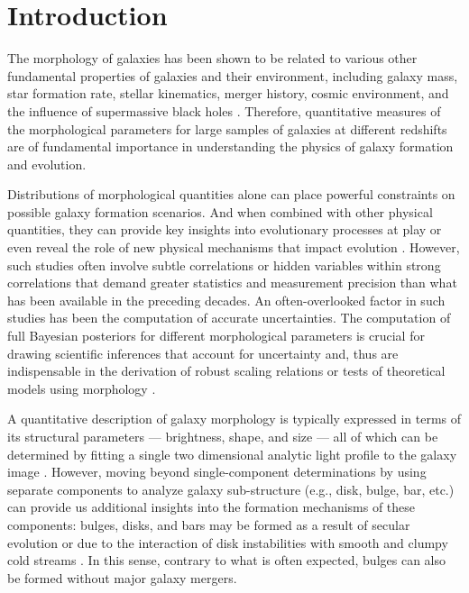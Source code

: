 \section{Introduction} \label{sec_c3:intro}

The morphology of galaxies has been shown to be related to various other fundamental properties of galaxies and their environment, including galaxy mass, star formation rate, stellar kinematics, merger history, cosmic environment, and the influence of supermassive black holes \citep[e.g.,][]{Bender1992DynamicallyProperties,Tremaine2002TheCorrelation,pozzetti_10, wuyts_11, Huertas-Company2016MassCANDELS,powell_17, hsc_morph_den, Dimauro2022CoincidenceGrowth}. Therefore, quantitative measures of the morphological parameters for large samples of galaxies at different redshifts are of fundamental importance in understanding the physics of galaxy formation and evolution. 

Distributions of morphological quantities alone can place powerful constraints on possible galaxy formation scenarios. And when combined with other physical quantities, they can provide key insights into evolutionary processes at play or even reveal the role of new physical  mechanisms that impact evolution \citep[e.g.,][]{Kauffmann2004TheGalaxies,Weinmann2006PropertiesMass,Schawinski2007TheGalaxies,vanderWel2008TheMass,Schawinski2014TheGalaxies}. However, such studies often involve subtle correlations or hidden variables within strong correlations that demand greater statistics and measurement precision than what has been available in the preceding decades. %
An often-overlooked factor in such studies has been the computation of accurate uncertainties. The computation of full Bayesian posteriors for different morphological parameters is crucial for drawing scientific inferences that account for uncertainty and, thus are indispensable in 
the derivation of robust scaling relations  \citep[e.g.,][]{Bernardi2013TheProfile, vanderWel20143D-HST+CANDELS:3} or tests of theoretical models using morphology \citep[e.g.,][]{Schawinski2014TheGalaxies}.

A quantitative description of galaxy morphology is typically expressed in terms of its structural parameters --- brightness, shape, and size --- all of which can be determined by fitting a single two dimensional analytic light profile to the galaxy image \citep[e.g.,][]{vdw_12,tarsitano_18}. However, moving beyond single-component determinations by using separate components to analyze galaxy sub-structure (e.g., disk, bulge, bar, etc.) can provide us additional insights into the formation mechanisms of these components: bulges, disks, and bars may be formed as a result of secular evolution \citep[e.g.,][]{kormendy_1979,kormendy_2004, genzel_2008, sellwood_2014} or due to the interaction of disk instabilities with smooth and clumpy cold streams \citep[e.g.,][]{dekel_09a,dekel_09b}. In this sense, contrary to what is often expected, bulges can also be formed without major galaxy mergers. 

